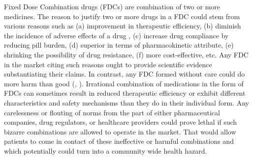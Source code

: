 \documentclass[AER]{AEA}
\theoremstyle{theorem}
\begin{document}
Fixed Dose Combination drugs (FDCs) are combination of two or more medicines. The reason to justify two or more drugs in a FDC could stem from various reasons such as (a) improvement in therapeutic efficiency, (b) diminish the incidence of adverse effects of a drug , (c) increase drug compliance by reducing pill burden, (d) superior in terms of pharmacokinetic attribute, (e) shrinking the possibility of drug resistance, (f) more cost-effective, etc. Any FDC in the market citing such reasons ought to provide scientific evidence substantiating their claims. In contrast, any FDC formed without care could do more harm than good (\cite{poudel2008irrational}, \cite{sharma2014irrational}). Irrational combination of medications in the form of FDCs can sometimes result in reduced therapeutic efficiency or exhibit different characteristics and safety mechanisms than they do in their individual form. Any carelessness or flouting of norms from the part of either pharmaceutical companies, drug regulators, or healthcare providers could prove lethal if such bizarre combinations are allowed to operate in the market. That would allow patients to come in contact of these ineffective or  harmful combinations and which potentially could turn into a community wide health hazard. 
\end{document}
